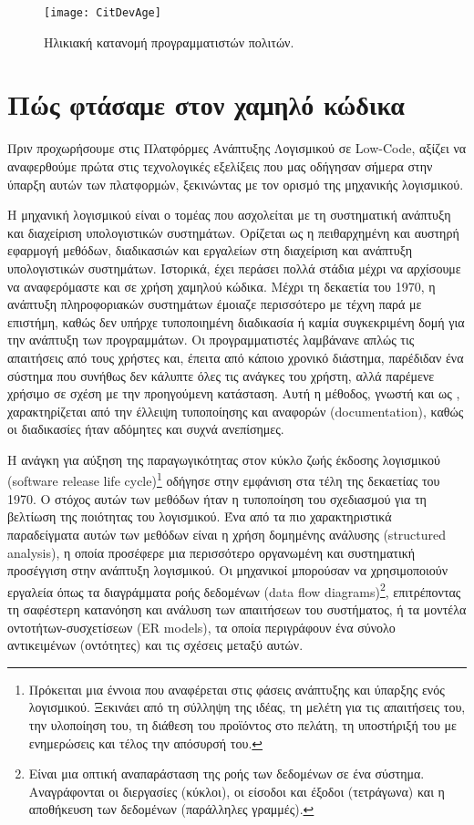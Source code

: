                     \begin{figure}[h!] \noindent \centering
                            \texttt{[image: CitDevAge]}
                            \caption{Ηλικιακή κατανομή προγραμματιστών πολιτών. \cite{CitDevTrackVia}}
                            \label{fig:CitDevAge}
                    \end{figure}


    \section{Πώς φτάσαμε στον χαμηλό κώδικα}
        Πριν προχωρήσουμε στις Πλατφόρμες Ανάπτυξης Λογισμικού σε Low-Code, αξίζει να αναφερθούμε πρώτα στις τεχνολογικές εξελίξεις που μας οδήγησαν σήμερα στην ύπαρξη αυτών των πλατφορμών, ξεκινώντας με τον ορισμό της μηχανικής λογισμικού.

        Η μηχανική λογισμικού είναι ο τομέας που ασχολείται με τη συστηματική ανάπτυξη και διαχείριση υπολογιστικών συστημάτων. Ορίζεται ως η πειθαρχημένη και αυστηρή εφαρμογή μεθόδων, διαδικασιών και εργαλείων στη διαχείριση και ανάπτυξη υπολογιστικών συστημάτων. Ιστορικά, έχει περάσει πολλά στάδια μέχρι να αρχίσουμε να αναφερόμαστε και σε χρήση χαμηλού κώδικα. Μέχρι τη δεκαετία του 1970, η ανάπτυξη πληροφοριακών συστημάτων έμοιαζε περισσότερο με τέχνη παρά με επιστήμη, καθώς δεν υπήρχε τυποποιημένη διαδικασία ή καμία συγκεκριμένη δομή για την ανάπτυξη των προγραμμάτων. Οι προγραμματιστές λαμβάνανε απλώς τις απαιτήσεις από τους χρήστες και, έπειτα από κάποιο χρονικό διάστημα, παρέδιδαν ένα σύστημα που συνήθως δεν κάλυπτε όλες τις ανάγκες του χρήστη, αλλά παρέμενε χρήσιμο σε σχέση με την προηγούμενη κατάσταση. Αυτή η μέθοδος, γνωστή και ως , χαρακτηρίζεται από την έλλειψη τυποποίησης και αναφορών (documentation), καθώς οι διαδικασίες ήταν αδόμητες και συχνά ανεπίσημες.

        Η ανάγκη για αύξηση της παραγωγικότητας στον κύκλο ζωής έκδοσης λογισμικού (software release life cycle)\footnote{Πρόκειται μια έννοια που αναφέρεται στις φάσεις ανάπτυξης και ύπαρξης ενός λογισμικού. Ξεκινάει από τη σύλληψη της ιδέας, τη μελέτη για τις απαιτήσεις του, την υλοποίηση του, τη διάθεση του προϊόντος στο πελάτη, τη υποστήριξή του με ενημερώσεις και τέλος την απόσυρσή του.} οδήγησε στην εμφάνιση  στα τέλη της δεκαετίας του 1970. Ο στόχος αυτών των μεθόδων ήταν η τυποποίηση του σχεδιασμού για τη βελτίωση της ποιότητας του λογισμικού. Ένα από τα πιο χαρακτηριστικά παραδείγματα αυτών των μεθόδων είναι η χρήση δομημένης ανάλυσης (structured analysis), η οποία προσέφερε μια περισσότερο οργανωμένη και συστηματική προσέγγιση στην ανάπτυξη λογισμικού. Οι μηχανικοί μπορούσαν να χρησιμοποιούν εργαλεία όπως τα διαγράμματα ροής δεδομένων (data flow diagrams)\footnote{Είναι μια οπτική αναπαράσταση της ροής των δεδομένων σε ένα σύστημα. Αναγράφονται οι διεργασίες (κύκλοι), οι είσοδοι και έξοδοι (τετράγωνα) και η αποθήκευση των δεδομένων (παράλληλες γραμμές).}, επιτρέποντας τη σαφέστερη κατανόηση και ανάλυση των απαιτήσεων του συστήματος, ή τα μοντέλα οντοτήτων-συσχετίσεων (ER models), τα οποία περιγράφουν ένα σύνολο αντικειμένων (οντότητες) και τις σχέσεις μεταξύ αυτών.

